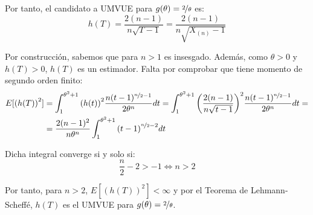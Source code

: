 \begin{ejercicio}[Reto]
    Por tanto, el candidato a UMVUE para $g(\theta) = \nicefrac{2}{\theta}$ es:
    \begin{equation*}
        h(T) = \frac{2(n-1)}{n\sqrt{T-1}} = \frac{2(n-1)}{n\sqrt{X_{(n)}-1}}
    \end{equation*}

    Por construcción, sabemos que para $n>1$ es insesgado. Además, como $\theta>0$ y $h(T)>0$, $h(T)$ es un estimador. Falta por comprobar que tiene momento de segundo orden finito:
    \begin{align*}
        E[{(h(T))}^{2}] &= \int_{1}^{\theta^2+1} {(h(t))}^{2} \frac{n(t-1)^{\nicefrac{n}{2}-1}}{2\theta^n} dt = \int_{1}^{\theta^2+1} {\left(\frac{2(n-1)}{n\sqrt{t-1}}\right)}^{2} \frac{n(t-1)^{\nicefrac{n}{2}-1}}{2\theta^n} dt
        =\\&= \frac{2(n-1)^2}{n\theta^n}\int_{1}^{\theta^2+1} {(t-1)}^{\nicefrac{n}{2}-2} dt
    \end{align*}

    Dicha integral converge si y solo si:
    \begin{equation*}
        \frac{n}{2}-2>-1\iff n>2
    \end{equation*}
    
    Por tanto, para $n>2$, $E[{(h(T))}^{2}]<\infty$ y por el Teorema de Lehmann-Scheffé, $h(T)$ es el UMVUE para $g(\theta) = \nicefrac{2}{\theta}$.
\end{ejercicio}